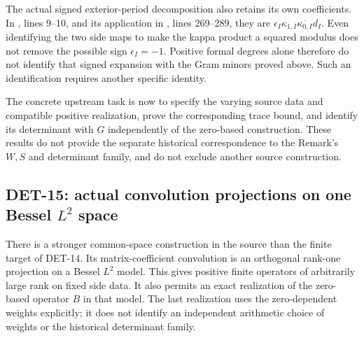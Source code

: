\documentclass[11pt,a4paper]{article}
\newcommand{\fid}[1]{\textsf{#1}}
\begin{document}
The actual signed exterior-period decomposition also retains its
own coefficients. In
,
lines 9--10, and its application in
,
lines 269--289, they are
\(\epsilon_I\kappa_{1,I}\overline{\kappa_{0,I}}d_I\).
Even identifying the two side maps to make the kappa product a
squared modulus does not remove the possible sign
\(\epsilon_I=-1\). Positive formal degrees alone therefore
do not identify that signed expansion with the Gram minors proved
above. Such an identification requires another specific identity.

The concrete upstream task is now to specify the varying source
data and compatible positive realization, prove the corresponding
trace bound, and identify its determinant with \(G\) independently
of the zero-based construction. These results do not provide the
separate historical correspondence to the Remark's \(W,S\) and
determinant family, and do not exclude another source construction.

\subsection{DET-15: actual convolution projections on one Bessel \texorpdfstring{$L^2$}{L2} space}
There is a stronger common-space construction in the source than the
finite target of \fid{DET-14}. Its matrix-coefficient convolution is
an orthogonal rank-one projection on a Bessel \(L^2\) model.
This gives positive finite operators of arbitrarily large rank on
fixed side data. It also permits an exact realization of the
zero-based operator \(B\) in that model. The last realization uses
the zero-dependent weights explicitly; it does not identify an
independent arithmetic choice of weights or the historical
determinant family.
\end{document}

